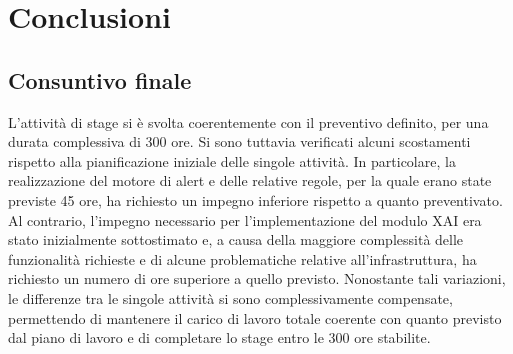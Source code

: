 \chapter{Conclusioni}
\label{chap:conclusioni}
\section{Consuntivo finale}
L'attività di stage si è svolta coerentemente con il preventivo definito, per una durata complessiva di 300 ore. Si sono tuttavia verificati alcuni scostamenti rispetto alla pianificazione iniziale delle 
singole attività. In particolare, la realizzazione del motore di alert e delle relative regole, per la quale erano state previste 45 ore, ha richiesto un impegno inferiore rispetto a quanto preventivato. 
Al contrario, l'impegno necessario per l'implementazione del modulo XAI era stato inizialmente sottostimato e, a causa della maggiore complessità delle funzionalità richieste e di alcune problematiche 
relative all'infrastruttura, ha richiesto un numero di ore superiore a quello previsto.
\newline
Nonostante tali variazioni, le differenze tra le singole attività si sono complessivamente compensate, permettendo di mantenere il carico di lavoro totale coerente con quanto previsto dal piano di lavoro e 
di completare lo stage entro le 300 ore stabilite.

\newpage
